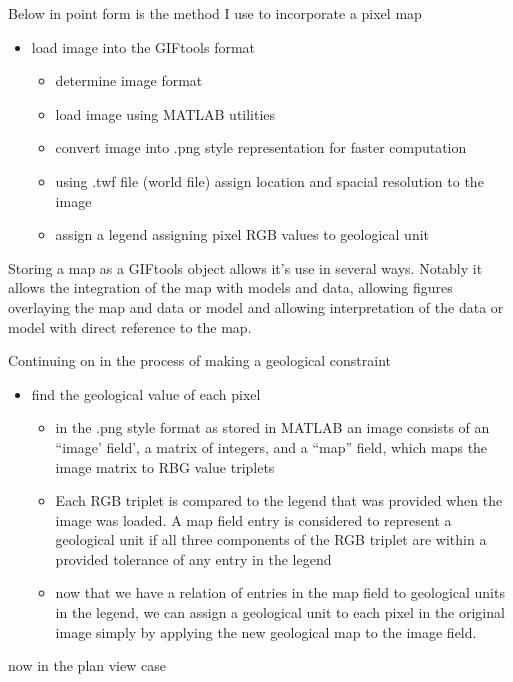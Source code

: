 Below in point form is the method I use to incorporate a pixel map

\begin{itemize}
\item load image into the GIFtools format
\begin{itemize}
	\item determine image format
	\item load image using MATLAB utilities
	\item convert image into .png style representation for faster computation
	\item using .twf file (world file) assign location and spacial resolution to the image
	\item assign a legend assigning pixel RGB values to geological unit
\end{itemize}
\end{itemize}

Storing a map as a GIFtools object allows it's use in several ways. Notably it allows the integration of the map with models and data, allowing figures overlaying the map and data or model and allowing interpretation of the data or model with direct reference to the map.

Continuing on in the process of making a geological constraint

\begin{itemize}
\item find the geological value of each pixel
\begin{itemize}
	\item in the .png style format as stored in MATLAB an image consists of an ``image' field', a matrix of integers, and a ``map'' field, which maps the image matrix to RBG value triplets
	\item Each RGB triplet is compared to the legend that was provided when the image was loaded. A map field entry is considered to represent a geological unit if all three components of the RGB triplet are within a provided tolerance of any entry in the legend
	\item now that we have a relation of entries in the map field to geological units in the legend, we can assign a geological unit to each pixel in the original image simply by applying the new geological map to the image field.
\end{itemize}
\end{itemize}

now in the plan view case

